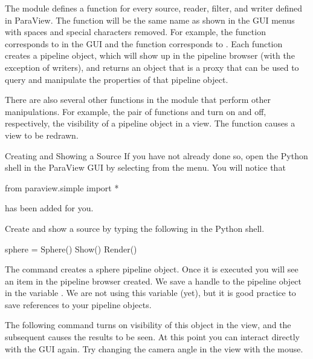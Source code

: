 The  module defines a function for every source,
reader, filter, and writer defined in ParaView.  The function will be the
same name as shown in the GUI menus with spaces and special characters
removed.  For example, the  function corresponds to
 \ra {} in the GUI and the 
function corresponds to  \ra {} \ra {}.  Each function creates a pipeline object, which will show up
in the pipeline browser (with the exception of writers), and returns an
object that is a proxy that can be used to query and manipulate the
properties of that pipeline object.

There are also several other functions in the 
module that perform other manipulations.  For example, the pair of
functions  and  turn on and off, respectively,
the visibility of a pipeline object in a view.  The 
function causes a view to be redrawn.

\begin{exercise}{Creating and Showing a Source}
  \label{ex:CreatingAndShowingASource}%
  If you have not already done so, open the Python shell in the ParaView
  GUI by selecting  \ra {} from the menu.  You
  will notice that
  \begin{python}
from paraview.simple import *
  \end{python}
  has been added for you.

  Create and show a  source by typing the following in the
  Python shell.
  \begin{python}
sphere = Sphere()
Show()
Render()
  \end{python}

  The  command creates a sphere pipeline object.  Once it is
  executed you will see an item in the pipeline browser created.  We save a
  handle to the pipeline object in the variable .  We are
  not using this variable (yet), but it is good practice to save references
  to your pipeline objects.

  The following  command turns on visibility of this object in
  the view, and the subsequent  causes the results to be
  seen.  At this point you can interact directly with the GUI again.  Try
  changing the camera angle in the view with the mouse.
\end{exercise}

